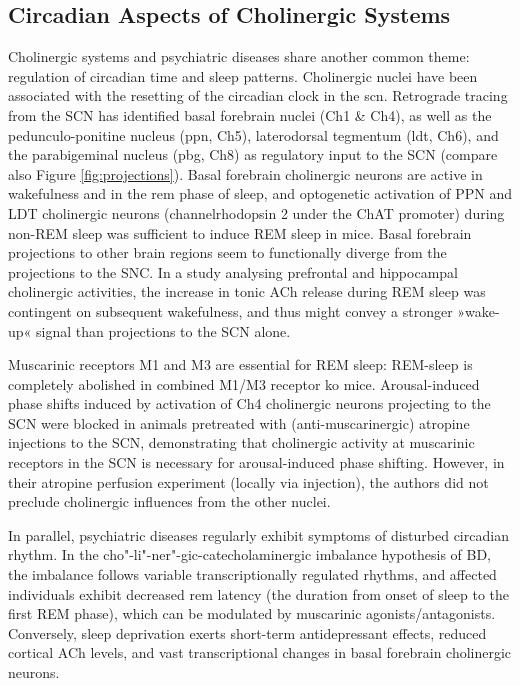\subsection{Circadian Aspects of Cholinergic Systems}
Cholinergic systems and psychiatric diseases share another common theme: regulation of circadian time and sleep patterns. Cholinergic nuclei have been associated with the resetting of the circadian clock in the \ac{scn}. Retrograde tracing from the SCN\cite{Bina1993} has identified basal forebrain nuclei (Ch1 \& Ch4), as well as the pedunculo-ponitine nucleus (\acs{ppn}, Ch5), laterodorsal tegmentum (\acs{ldt}, Ch6), and the parabigeminal nucleus (\ac{pbg}, Ch8) as regulatory input to the SCN (compare also Figure \ref{fig:projections}). Basal forebrain cholinergic neurons are active in wakefulness and in the \ac{rem} phase of sleep,\cite{Xu2015} and optogenetic activation of PPN and LDT cholinergic neurons (channelrhodopsin 2 under the ChAT promoter) during non-REM sleep was sufficient to induce REM sleep in mice.\cite{VanDort2015} Basal forebrain projections to other brain regions seem to functionally diverge from the projections to the SNC. In a study analysing prefrontal and hippocampal cholinergic activities, the increase in tonic ACh release during REM sleep was contingent on subsequent wakefulness,\cite{Teles-GriloRuivo2017} and thus might convey a stronger »wake-up« signal than projections to the SCN alone.

Muscarinic receptors M1 and M3 are essential for REM sleep: REM-sleep is completely abolished in combined M1/M3 receptor \ac{ko} mice.\cite{Niwa2018} Arousal-induced phase shifts induced by activation of Ch4 cholinergic neurons projecting to the SCN were blocked in animals pretreated with (anti-muscarinergic) atropine injections to the SCN, demonstrating that cholinergic activity at muscarinic receptors in the SCN is necessary for arousal-induced phase shifting.\cite{Yamakawa2016} However, in their atropine perfusion experiment (locally via injection), the authors did not preclude cholinergic influences from the other nuclei. 

In parallel, psychiatric diseases regularly exhibit symptoms of disturbed circadian rhythm. In the cho"-li"-ner"-gic-catecholaminergic imbalance hypothesis of BD,\cite{VanEnkhuizen2015} the imbalance follows variable transcriptionally regulated rhythms, and affected individuals exhibit decreased \ac{rem} latency (the duration from onset of sleep to the first REM phase), which can be modulated by muscarinic agonists/antagonists.\cite{Ising2005} Conversely, sleep deprivation exerts short-term antidepressant effects,\cite{Wu1990} reduced cortical ACh levels,\cite{Boonstra2007} and vast transcriptional changes in basal forebrain cholinergic neurons.\cite{Nikonova2017}

